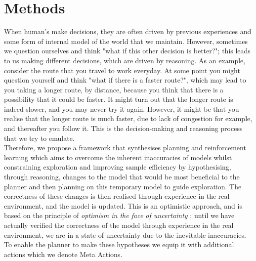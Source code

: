 \chapter{Methods}
\label{chapter4}

When human's make decisions, they are often driven by previous experiences and some form of internal model of the world that we maintain. However, sometimes we question ourselves and think "what if this other decision is better?"; this leads to us making different decisions, which are driven by reasoning. As an example, consider the route that you travel to work everyday. At some point you might question yourself and think "what if there is a faster route?", which may lead to you taking a longer route, by distance, because you think that there is a possibility that it could be faster. It might turn out that the longer route is indeed slower, and you may never try it again. However, it might be that you realise that the longer route is much faster, due to lack of congestion for example, and thereafter you follow it. This is the decision-making and reasoning process that we try to emulate.
\\Therefore, we propose a framework that synthesises planning and reinforcement learning which aims to overcome the inherent inaccuracies of models whilst constraining exploration  and improving sample efficiency by hypothesising, through reasoning, changes to the model that would be most beneficial to the planner and then planning on this temporary model to guide exploration. The correctness of these changes is then realised through experience in the real environment, and the model is updated.
This is an optimistic approach, and is based on the principle of \textit{optimism in the face of uncertainty} \cite{lai-allocation}; until we have actually verified the correctness of the model through experience in the real environment, we are in a state of uncertainty due to the inevitable inaccuracies.
To enable the planner to make these hypotheses we equip it with additional actions which we denote Meta Actions.
